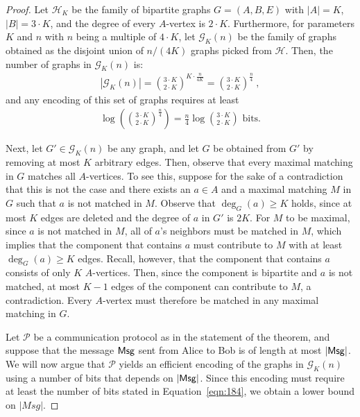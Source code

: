 \documentclass[11pt,a4paper]{article}
\begin{document}
\begin{proof}
 Let $\mathcal{H}_K$ be the family of bipartite graphs $G=(A, B, E)$ with $|A| = K$, $|B| = 3 \cdot K$, and the degree of every $A$-vertex is $2 \cdot K$.
 Furthermore, for parameters $K$ and $n$ with $n$ being a multiple of $4 \cdot K$, let $\mathcal{G}_K(n)$ be the family of graphs obtained as the disjoint union of $n / (4K)$ graphs picked from $\mathcal{H}$.
 Then, the number of graphs in $\mathcal{G}_K(n)$ is:
 \begin{align*}
  |\mathcal{G}_K(n)| = {3 \cdot K \choose 2 \cdot K}^{K \cdot \frac{n}{4 K}} 
   = {3 \cdot K \choose 2 \cdot K}^{\frac{n}{4}}  \ , 
 \end{align*}
and any encoding of this set of graphs requires at least
\begin{align}
 \log \left( {3 \cdot K \choose 2 \cdot K}^{\frac{n}{4}} \right) = \frac{n}{4} \log {3 \cdot K \choose 2 \cdot K} \text{ bits.} \label{eqn:184}
\end{align}



 Next, let $G' \in \mathcal{G}_K(n)$ be any graph, and let $G$ be obtained from $G'$ by removing at most $K$ arbitrary edges. Then, observe that every maximal matching in $G$ matches all $A$-vertices. To see this, suppose for the sake of a contradiction that this is not the case and there exists an $a \in A$ and a maximal matching $M$ in $G$ such that $a$ is not matched in $M$. Observe that $\deg_G(a) \ge K$ holds, since at most $K$ edges are deleted and the degree of $a$ in $G'$ is $2K$. For $M$ to be maximal, since $a$ is not matched in $M$, all of $a$'s neighbors must be matched in $M$, which implies that the component that contains $a$ must contribute to $M$ with at least $\deg_G(a) \ge K$ edges. Recall, however, that the component that contains $a$ consists of only $K$ $A$-vertices. Then, since the component is bipartite and $a$ is not matched, at most $K-1$ edges of the component can contribute to $M$, a contradiction. Every $A$-vertex must therefore be matched in any maximal matching in $G$.
  
 Let $\mathcal{P}$ be a communication protocol as in the statement of the theorem, and suppose that the message ${\sf Msg}$ sent from Alice to Bob is of length at most $|{\sf Msg}|$. 
We will now argue that $\mathcal{P}$ yields an efficient encoding of the graphs in $\mathcal{G}_K(n)$ using a number of bits that depends on $|{\sf Msg}|$. Since this encoding must require at least the number of bits stated in Equation~\ref{eqn:184}, we obtain a lower bound on $|Msg|$.



\end{proof}
\end{document}
